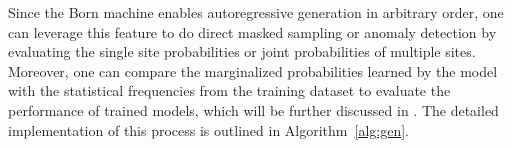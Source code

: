 Since the Born machine enables autoregressive generation in arbitrary order, one can leverage this feature to do direct masked sampling or anomaly detection by evaluating the single site probabilities  or joint probabilities of multiple sites. Moreover, one can compare the marginalized probabilities learned by the model with the statistical frequencies from the training dataset to evaluate the performance of trained models, which will be further discussed in . The detailed implementation of this process is outlined in Algorithm~\ref{alg:gen}.





